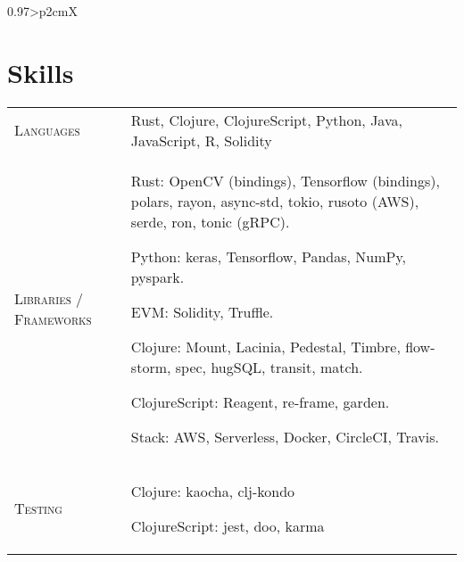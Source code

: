 \documentclass[a4paper, oneside, final]{scrartcl}
\newcommand{\gray}{\rowcolor[gray]{.90}}
\begin{document}
\begin{center}
\begin{tabularx}{0.97\linewidth}{>{\raggedleft\scshape}p{2cm}X}
\end{tabularx}

\section{Skills}

    \begin{tabularx}{0.97\linewidth}{>{\raggedleft\scshape}p{2cm}X}
    \gray Languages & {Rust, Clojure, ClojureScript, Python, Java, JavaScript, R, Solidity}\\

    \gray Libraries / Frameworks & {Rust: OpenCV (bindings), Tensorflow (bindings), polars, rayon, async-std, tokio, rusoto (AWS), serde, ron, tonic (gRPC).

                                    Python: keras, Tensorflow, Pandas, NumPy, pyspark.


                                    EVM: Solidity, Truffle.

                                    Clojure: Mount, Lacinia, Pedestal, Timbre, flow-storm, spec, hugSQL, transit, match.

                                    ClojureScript: Reagent, re-frame, garden.

                                    Stack: AWS, Serverless, Docker, CircleCI, Travis.
                                   }\\

 \gray Testing & {Clojure: kaocha, clj-kondo

                  ClojureScript: jest, doo, karma
 }\\


\end{tabularx}
\end{center}
\end{document}
